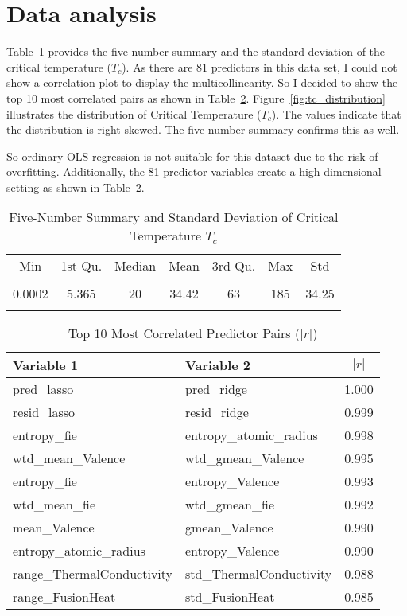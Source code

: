 \documentclass[conference]{IEEEtran}
\begin{document}
\section {Data analysis}

Table~\ref{tab:summary} provides the five-number summary and the standard deviation 
of the critical temperature ($T_c$). As there are 81 predictors in this data set, I could not show a correlation plot to display the multicollinearity.
So I decided to show the top 10 most correlated pairs as shown in Table~\ref{tab:top_corr}.
Figure~\ref{fig:tc_distribution} illustrates the distribution of Critical Temperature ($T_c$). The values indicate that the distribution is 
right-skewed. The five number summary confirms this as well.

So ordinary OLS regression is not suitable for this dataset due to the risk of overfitting.
Additionally, the 81 predictor variables create a high-dimensional setting as shown in Table~\ref{tab:top_corr}.

\begin{table}[h]
\centering
\caption{Five-Number Summary and Standard Deviation of Critical Temperature $T_c$ }
\label{tab:summary}
\begin{tabular}{ccccccc}
\toprule
Min & 1st Qu. & Median & Mean & 3rd Qu. & Max & Std \\\\
\midrule
0.0002 & 5.365 & 20 & 34.42 & 63 & 185 & 34.25 \\\\
\bottomrule
\end{tabular}
\end{table}

\begin{table}[htbp]
\centering
\caption{Top 10 Most Correlated Predictor Pairs ($|r|$)}
\label{tab:top_corr}
\begin{tabular}{l l c}
\toprule
Variable 1 & Variable 2 & $|r|$ \\
\midrule
pred\_lasso & pred\_ridge & 1.000 \\
resid\_lasso & resid\_ridge & 0.999 \\
entropy\_fie & entropy\_atomic\_radius & 0.998 \\
wtd\_mean\_Valence & wtd\_gmean\_Valence & 0.995 \\
entropy\_fie & entropy\_Valence & 0.993 \\
wtd\_mean\_fie & wtd\_gmean\_fie & 0.992 \\
mean\_Valence & gmean\_Valence & 0.990 \\
entropy\_atomic\_radius & entropy\_Valence & 0.990 \\
range\_ThermalConductivity & std\_ThermalConductivity & 0.988 \\
range\_FusionHeat & std\_FusionHeat & 0.985 \\
\bottomrule
\end{tabular}
\end{table}
\end{document}
